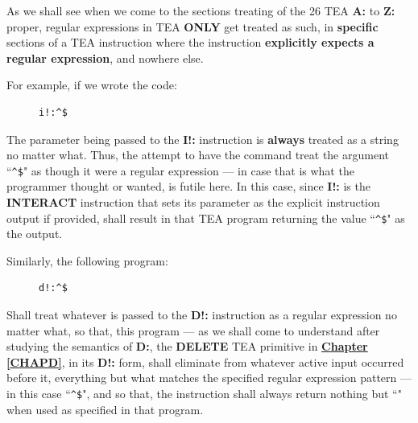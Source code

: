 \documentclass[a4paper, 18pt]{book} %
\begin{document}
As we shall see when we come to the sections treating of the 26 TEA \textbf{A:} to \textbf{Z:} proper, regular expressions in TEA \textbf{ONLY} get treated as such, in \textbf{specific} sections of a TEA instruction where the instruction \textbf{explicitly expects a regular expression}, and nowhere else. 

For example, if we wrote the code:

\begin{figure}[H]
 \Large
  \centering
  \begin{tcolorbox}[teaterminalstyle, title=TEA Program Example 1]
  \begin{lstlisting}[language=TEA]
i!:^$
   \end{lstlisting}
  \end{tcolorbox}
\end{figure}

The parameter being passed to the \textbf{I!:} instruction is \textbf{always} treated as a string no matter what. Thus, the attempt to have the command treat the argument ``\verb|^$|" as though it were a regular expression --- in case that is what the programmer thought or wanted, is futile here. In this case, since \textbf{I!:} is the \textbf{INTERACT} instruction that sets its parameter as the explicit instruction output if provided, shall result in that TEA program returning the value ``\verb|^$|" as the output.

Similarly, the following program:


\begin{figure}[H]
 \Large
  \centering
  \begin{tcolorbox}[teaterminalstyle, title=TEA Program Example 2]
  \begin{lstlisting}[language=TEA]
d!:^$
   \end{lstlisting}
  \end{tcolorbox}
\end{figure}

Shall treat whatever is passed to the \textbf{D!:} instruction as a regular expression no matter what, so that, this program --- as we shall come to understand after studying the semantics of \textbf{D:}, the \textbf{DELETE} TEA primitive in \textbf{\hyperref[CHAPD]{Chapter \ref{CHAPD}}}, in its \textbf{D!:} form, shall eliminate from whatever active input occurred before it, everything but what matches the specified regular expression pattern --- in this case ``\verb|^$|", and so that, the instruction shall always return nothing but ``" when used as specified in that program.
\end{document}

